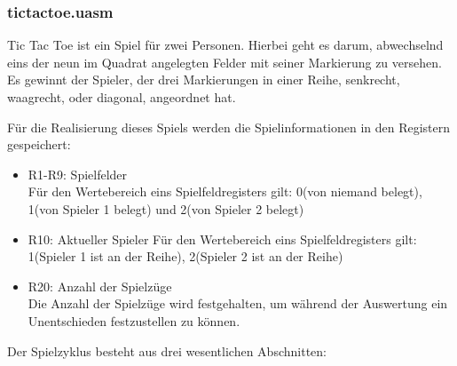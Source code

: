 \subsubsection{tictactoe.uasm}
Tic Tac Toe ist ein Spiel für zwei Personen. Hierbei geht es darum, abwechselnd 
eins der neun im Quadrat angelegten Felder mit seiner Markierung zu versehen. Es
gewinnt der Spieler, der drei Markierungen in einer Reihe, senkrecht, waagrecht,
oder diagonal, angeordnet hat.

Für die Realisierung dieses Spiels werden die Spielinformationen in den
Registern 
gespeichert:
 \begin{itemize}
 \item R1-R9: Spielfelder\\
 Für den Wertebereich eins Spielfeldregisters gilt: 0(von niemand belegt), 
 1(von Spieler 1 belegt) und 2(von Spieler 2 belegt)
 \item R10: Aktueller Spieler
 Für den Wertebereich eins Spielfeldregisters gilt: 1(Spieler 1 ist an der 
 Reihe), 2(Spieler 2 ist an der Reihe)
 \item R20: Anzahl der Spielzüge\\
 Die Anzahl der Spielzüge wird festgehalten, um während der Auswertung ein 
 Unentschieden festzustellen zu können.
 \end{itemize}
Der Spielzyklus besteht aus drei wesentlichen Abschnitten:
